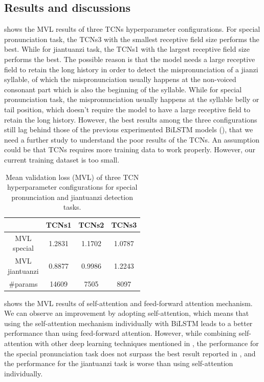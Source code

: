 \subsection{Results and discussions}

 shows the \gls{MVL} results of three \gls{TCNs} hyperparameter configurations. For special pronunciation task, the \gls{TCNs}3 with the smallest receptive field size performs the best. While for \gls{jiantuanzi} task, the \gls{TCNs}1 with the largest receptive field size performs the best. The possible reason is that the model needs a large receptive field to retain the long history in order to detect the mispronunciation of a \gls{jianzi} syllable, of which the mispronunciation usually happens at the non-voiced consonant part which is also the beginning of the syllable. While for special pronunciation task, the mispronunciation usually happens at the syllable belly or tail position, which doesn't require the model to have a large receptive field to retain the long history. However, the best results among the three configurations still lag behind those of the previous experimented \gls{BiLSTM} models (), that we need a further study to understand the poor results of the \gls{TCNs}. An assumption could be that \gls{TCNs} requires more training data to work properly. However, our current training dataset is too small.

\begin{table}[ht!]
\centering
\caption{Mean validation loss (MVL) of three TCN hyperparameter configurations for special pronunciation and jiantuanzi detection tasks.}
\label{tab:ch6:results_tcns_val}
\begin{tabular}{cccc}
\toprule
& TCNs1 & TCNs2 & TCNs3 \\
\midrule
\makecell{MVL\\special} & 1.2831 & 1.1702 & 1.0787 \\
\makecell{MVL\\jiantuanzi} & 0.8877 & 0.9986 & 1.2243 \\
\#params & 14609 & 7505 & 8097 \\
\bottomrule
\end{tabular}
\end{table}

 shows the \gls{MVL} results of self-attention and feed-forward attention mechanism. We can observe an improvement by adopting self-attention, which means that using the self-attention mechanism individually with \gls{BiLSTM} leads to a better performance than using feed-forward attention. However, while combining self-attention with other deep learning techniques mentioned in , the performance for the special pronunciation task does not surpass the best result reported in , and the performance for the \gls{jiantuanzi} task is worse than using self-attention individually.

